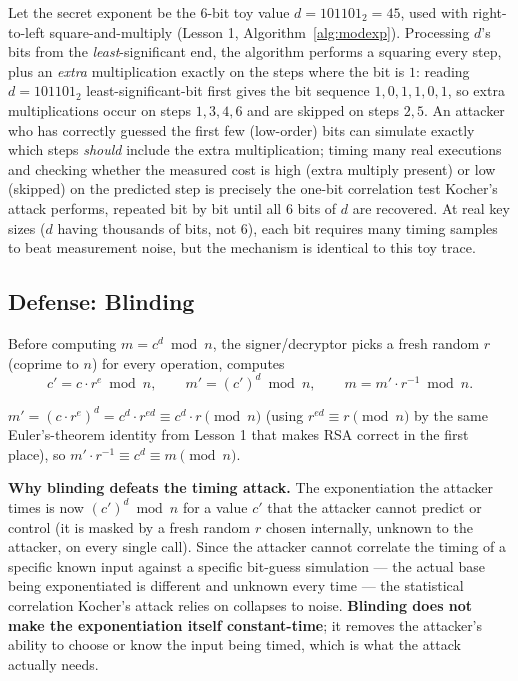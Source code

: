 \begin{example}
Let the secret exponent be the 6-bit toy value $d = 101101_2 = 45$, used with right-to-left square-and-multiply (Lesson 1, Algorithm~\ref{alg:modexp}). Processing $d$'s bits from the \emph{least}-significant end, the algorithm performs a squaring every step, plus an \emph{extra} multiplication exactly on the steps where the bit is $1$: reading $d=101101_2$ least-significant-bit first gives the bit sequence $1,0,1,1,0,1$, so extra multiplications occur on steps $1,3,4,6$ and are skipped on steps $2,5$. An attacker who has correctly guessed the first few (low-order) bits can simulate exactly which steps \emph{should} include the extra multiplication; timing many real executions and checking whether the measured cost is high (extra multiply present) or low (skipped) on the predicted step is precisely the one-bit correlation test Kocher's attack performs, repeated bit by bit until all 6 bits of $d$ are recovered. At real key sizes ($d$ having thousands of bits, not 6), each bit requires many timing samples to beat measurement noise, but the mechanism is identical to this toy trace.
\end{example}

\subsection{Defense: Blinding}

\begin{definition}
Before computing $m = c^d \bmod n$, the signer/decryptor picks a fresh random $r$ (coprime to $n$) for every operation, computes
\[
c' = c \cdot r^{e} \bmod n, \qquad m' = (c')^{d} \bmod n, \qquad m = m' \cdot r^{-1} \bmod n.
\]
\end{definition}

\begin{proposition}
$m' = (c \cdot r^e)^d = c^d \cdot r^{ed} \equiv c^d \cdot r \pmod n$ (using $r^{ed} \equiv r \pmod n$ by the same Euler's-theorem identity from Lesson 1 that makes RSA correct in the first place), so $m' \cdot r^{-1} \equiv c^d \equiv m \pmod n$.
\end{proposition}

\medskip\noindent\textbf{Why blinding defeats the timing attack.} The exponentiation the attacker times is now $(c')^d \bmod n$ for a value $c'$ that the attacker cannot predict or control (it is masked by a fresh random $r$ chosen internally, unknown to the attacker, on every single call). Since the attacker cannot correlate the timing of a specific known input against a specific bit-guess simulation — the actual base being exponentiated is different and unknown every time — the statistical correlation Kocher's attack relies on collapses to noise. \textbf{Blinding does not make the exponentiation itself constant-time}; it removes the attacker's ability to choose or know the input being timed, which is what the attack actually needs.

